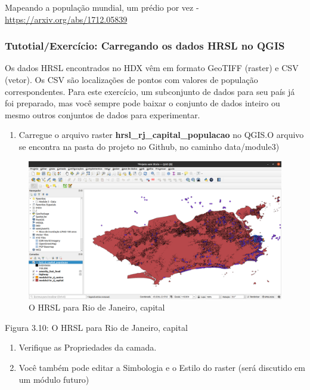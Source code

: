 \documentclass[
]{krantz}
\providecommand{\tightlist}{%
  \setlength{\itemsep}{0pt}\setlength{\parskip}{0pt}}
\begin{document}
Mapeando a população mundial, um prédio por vez - \url{https://arxiv.org/abs/1712.05839}

\hypertarget{tutotialexercuxedcio-carregando-os-dados-hrsl-no-qgis}{%
\subsubsection{Tutotial/Exercício: Carregando os dados HRSL no QGIS}\label{tutotialexercuxedcio-carregando-os-dados-hrsl-no-qgis}}

Os dados HRSL encontrados no HDX vêm em formato GeoTIFF (raster) e CSV (vetor). Os CSV são localizações de pontos com valores de população correspondentes. Para este exercício, um subconjunto de dados para seu país já foi preparado, mas você sempre pode baixar o conjunto de dados inteiro ou mesmo outros conjuntos de dados para experimentar.

\begin{enumerate}
\def\labelenumi{\arabic{enumi}.}
\tightlist
\item
  Carregue o arquivo raster \textbf{hrsl\_rj\_capital\_populacao} no QGIS.O arquivo se encontra na pasta do projeto no Github, no caminho data/module3)
\end{enumerate}

\begin{figure}
\centering
\includegraphics{media/modulo3/hrsl-1.png}
\caption{O HRSL para Rio de Janeiro, capital}
\end{figure}

Figura 3.10: O HRSL para Rio de Janeiro, capital

\begin{enumerate}
\def\labelenumi{\arabic{enumi}.}
\setcounter{enumi}{1}
\tightlist
\item
  Verifique as Propriedades da camada.
\item
  Você também pode editar a Simbologia e o Estilo do raster (será discutido em um módulo futuro)
\end{enumerate}
\end{document}
